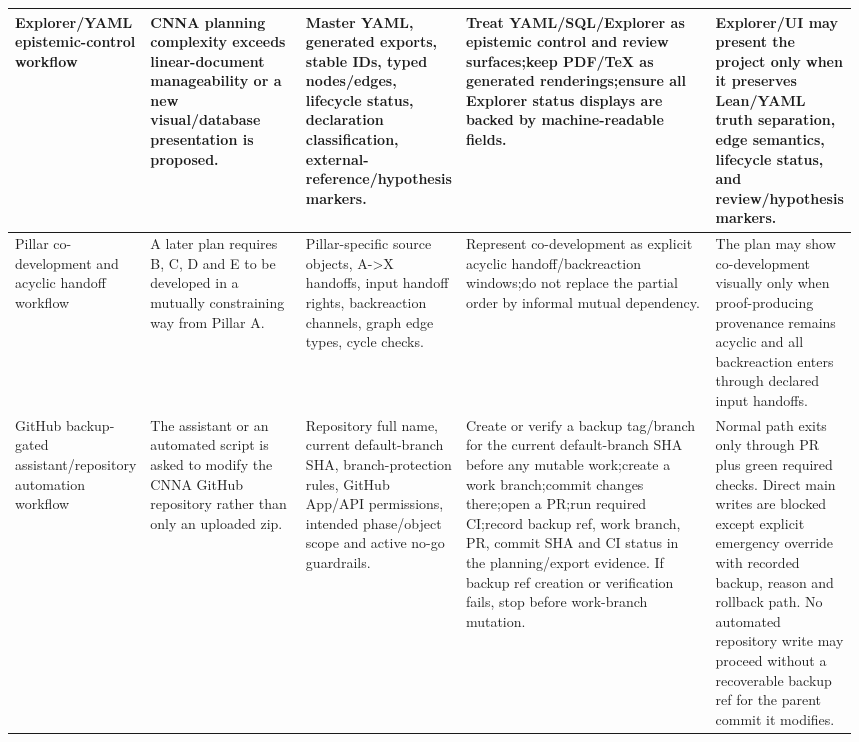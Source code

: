 \begin{longtable}{L{0.14\linewidth} L{0.19\linewidth} L{0.18\linewidth} L{0.31\linewidth} L{0.16\linewidth}}
\hline
\addlinespace[0.24em]
Explorer/\allowbreak{}YAML epistemic-control workflow & CNNA planning complexity exceeds linear-document manageability or a new visual/\allowbreak{}database presentation is proposed. & Master YAML, generated exports, stable IDs, typed nodes/\allowbreak{}edges, lifecycle status, declaration classification, external-reference/\allowbreak{}hypothesis markers. & Treat YAML/\allowbreak{}SQL/\allowbreak{}Explorer as epistemic control and review surfaces;\newline keep PDF/\allowbreak{}TeX as generated renderings;\newline ensure all Explorer status displays are backed by machine-readable fields. & Explorer/\allowbreak{}UI may present the project only when it preserves Lean/\allowbreak{}YAML truth separation, edge semantics, lifecycle status, and review/\allowbreak{}hypothesis markers.\\
\hline
\addlinespace[0.24em]
Pillar co-development and acyclic handoff workflow & A later plan requires B, C, D and E to be developed in a mutually constraining way from Pillar A. & Pillar-specific source objects, A->X handoffs, input handoff rights, backreaction channels, graph edge types, cycle checks. & Represent co-development as explicit acyclic handoff/\allowbreak{}backreaction windows;\newline do not replace the partial order by informal mutual dependency. & The plan may show co-development visually only when proof-producing provenance remains acyclic and all backreaction enters through declared input handoffs.\\
\hline
\addlinespace[0.24em]
GitHub backup-gated assistant/\allowbreak{}repository automation workflow & The assistant or an automated script is asked to modify the CNNA GitHub repository rather than only an uploaded zip. & Repository full name, current default-branch SHA, branch-protection rules, GitHub App/\allowbreak{}API permissions, intended phase/\allowbreak{}object scope and active no-go guardrails. & Create or verify a backup tag/\allowbreak{}branch for the current default-branch SHA before any mutable work;\newline create a work branch;\newline commit changes there;\newline open a PR;\newline run required CI;\newline record backup ref, work branch, PR, commit SHA and CI status in the planning/\allowbreak{}export evidence. If backup ref creation or verification fails, stop before work-branch mutation. & Normal path exits only through PR plus green required checks. Direct main writes are blocked except explicit emergency override with recorded backup, reason and rollback path. No automated repository write may proceed without a recoverable backup ref for the parent commit it modifies.\\

\end{longtable}
